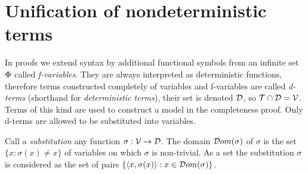 %
%
%
%
%
\section{Unification of nondeterministic terms}\label{se:unification}
%
%
In proofs we extend syntax by additional functional symbols from an infinite
set \(\Phi\) called {\em f-variables}.  They are always interpreted as
deterministic functions, therefore terms constructed completely of variables
and f-variables are called {\em d-terms} (shorthand for {\em deterministic
terms}), their set is denoted ${\cal D}$, so \({\cal T} \cap {\cal D} ={\cal V}\).
Terms of this kind are used to construct a model in the completeness proof.
Only d-terms are allowed to be substituted into variables. \vspace{.5ex}

\begin{definition}\label{def:substitution}
Call a {\em substitution} any function \(\sigma:{\cal V} \to {\cal D}\).  The
domain \({\sl{\cal D}om} (\sigma)\) of $\sigma$ is the set \(\{x: \sigma(x) \neq x\}\)
of variables on which $\sigma$ is non-trivial.  As a set the substitution
$\sigma$ is considered as the set of pairs \(\{\langle x,\sigma(x)\rangle: x\in{\sl{\cal D}om}
(\sigma)\}\).
\end{definition} \vspace{.5ex}

